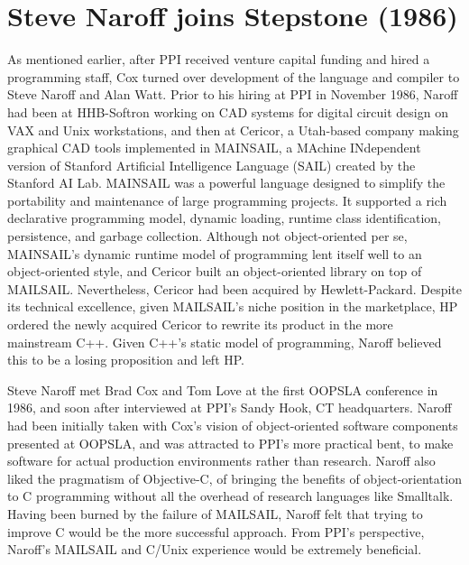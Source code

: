 \documentclass[acmsmall,screen]{acmart}
\begin{document}
\section{Steve Naroff joins Stepstone (1986)}
\label{sec-SteveNaroffJoinsStepstone1986}
As mentioned earlier, after PPI received venture capital funding and hired a programming staff, Cox turned over development of the language and compiler to Steve Naroff and Alan Watt. Prior to his hiring at PPI in November 1986, Naroff had been at HHB-Softron working on CAD systems for digital circuit design on VAX and Unix workstations, and then at Cericor, a Utah-based company making graphical CAD tools implemented in MAINSAIL, a MAchine INdependent version of Stanford Artificial Intelligence Language (SAIL) created by the Stanford AI Lab. MAINSAIL was a powerful language designed to simplify the portability and maintenance of large programming projects. It supported a rich declarative programming model, dynamic loading, runtime class identification, persistence, and garbage collection. Although not object-oriented per se, MAINSAIL's dynamic runtime model of programming lent itself well to an object-oriented style, and Cericor built an object-oriented library on top of MAILSAIL. Nevertheless, Cericor had been acquired by Hewlett-Packard. Despite its technical excellence, given MAILSAIL's niche position in the marketplace, HP ordered the newly acquired Cericor to rewrite its product in the more mainstream C++. Given C++'s static model of programming, Naroff believed this to be a losing proposition and left HP.

Steve Naroff met Brad Cox and Tom Love at the first OOPSLA conference in 1986, and soon after interviewed at PPI's Sandy Hook, CT headquarters. Naroff had been initially taken with Cox's vision of object-oriented software components presented at OOPSLA, and was attracted to PPI's more practical bent, to make software for actual production environments rather than research. Naroff also liked the pragmatism of Objective-C, of bringing the benefits of object-orientation to C programming without all the overhead of research languages like Smalltalk. Having been burned by the failure of MAILSAIL, Naroff felt that trying to improve C would be the more successful approach. From PPI's perspective, Naroff's MAILSAIL and C/Unix experience would be extremely beneficial.
\end{document}
